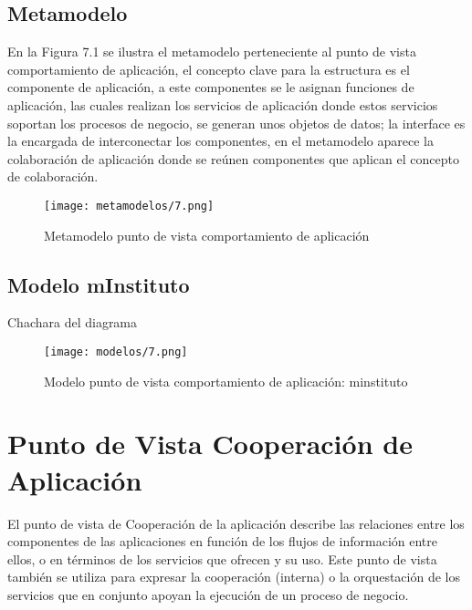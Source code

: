\subsection{Metamodelo}
En la Figura 7.1 se ilustra el metamodelo perteneciente al punto de vista comportamiento de aplicación, el concepto clave para la estructura es el componente de aplicación, a este componentes se le asignan funciones de aplicación, las cuales realizan los servicios de aplicación donde estos servicios soportan los procesos de negocio, se generan unos objetos de datos; la interface es la encargada de interconectar los componentes, en el metamodelo aparece la colaboración de aplicación donde se reúnen componentes que aplican el concepto
de colaboración.

\begin{figure}[!h]
	\centering
	\texttt{[image: metamodelos/7.png]}
	\captionsetup{width=.95\textwidth}
	\caption{Metamodelo punto de vista comportamiento de aplicación}
	\label{metamodelo7}
\end{figure}

\subsection{Modelo mInstituto}Chachara del diagrama
\begin{figure}[!h]
	\centering
	\texttt{[image: modelos/7.png]}
	\captionsetup{width=.95\textwidth}
	\caption{Modelo punto de vista comportamiento de aplicación: minstituto}
	\label{modelo7}
\end{figure}

\section{Punto de Vista Cooperación de Aplicación}
El punto de vista de Cooperación de la aplicación describe las relaciones entre los componentes de las aplicaciones en función de los flujos de información entre ellos, o en términos de los servicios que ofrecen y su uso. Este punto de vista también se utiliza para expresar la cooperación (interna) o la orquestación de los servicios que en conjunto apoyan la ejecución de un proceso de negocio.

